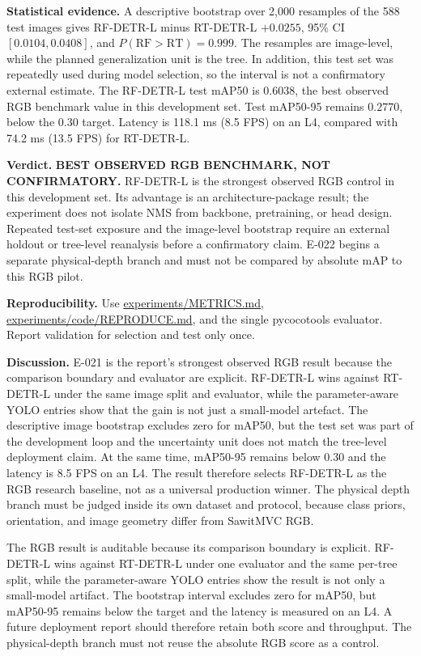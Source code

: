 \documentclass[preprint,12pt]{elsarticle}
\newcommand{\pathcode}[1]{\scriptsize\url{#1}}
\begin{document}
\textbf{Statistical evidence.} A descriptive bootstrap over 2,000 resamples of
the 588 test images gives RF-DETR-L minus RT-DETR-L \(+0.0255\), 95\% CI
\([0.0104,0.0408]\), and \(P(\mathrm{RF}>\mathrm{RT})=0.999\). The resamples
are image-level, while the planned generalization unit is the tree. In
addition, this test set was repeatedly used during model selection, so the
interval is not a confirmatory external estimate. The RF-DETR-L test mAP50 is
\(0.6038\), the best observed RGB benchmark value in this development set.
Test mAP50-95 remains \(0.2770\), below the \(0.30\) target. Latency is
118.1 ms (8.5 FPS) on an L4, compared with 74.2 ms (13.5 FPS) for RT-DETR-L.

\textbf{Verdict.} \textbf{BEST OBSERVED RGB BENCHMARK, NOT CONFIRMATORY.}
RF-DETR-L is the strongest observed RGB control in this development set. Its
advantage is an architecture-package result; the experiment does not isolate
NMS from backbone, pretraining, or head design. Repeated test-set exposure and
the image-level bootstrap require an external holdout or tree-level
reanalysis before a confirmatory claim. E-022 begins a separate physical-depth
branch and must not be compared by absolute mAP to this RGB pilot.

\textbf{Reproducibility.} Use \pathcode{experiments/METRICS.md},
\pathcode{experiments/code/REPRODUCE.md}, and the single
pycocotools evaluator. Report validation for selection and test only once.

\textbf{Discussion.} E-021 is the report's strongest observed RGB result
because the comparison boundary and evaluator are explicit. RF-DETR-L wins
against RT-DETR-L under the same image split and evaluator, while the
parameter-aware YOLO entries show that the gain is not just a small-model
artefact. The descriptive image bootstrap excludes zero for mAP50, but the
test set was part of the development loop and the uncertainty unit does not
match the tree-level deployment claim. At the same time, mAP50-95 remains
below 0.30 and the latency is 8.5 FPS on an L4. The result therefore selects
RF-DETR-L as the RGB research baseline, not as a universal production winner.
The physical
depth branch must be judged inside its own dataset and protocol, because
class priors, orientation, and image geometry differ from SawitMVC RGB.

The RGB result is auditable because its comparison boundary is explicit.
RF-DETR-L wins against RT-DETR-L under one evaluator and the same per-tree
split, while the parameter-aware YOLO entries show the result is not only a
small-model artifact. The bootstrap interval excludes zero for mAP50, but
mAP50-95 remains below the target and the latency is measured on an L4. A
future deployment report should therefore retain both score and throughput.
The physical-depth branch must not reuse the absolute RGB score as a control.
\end{document}

